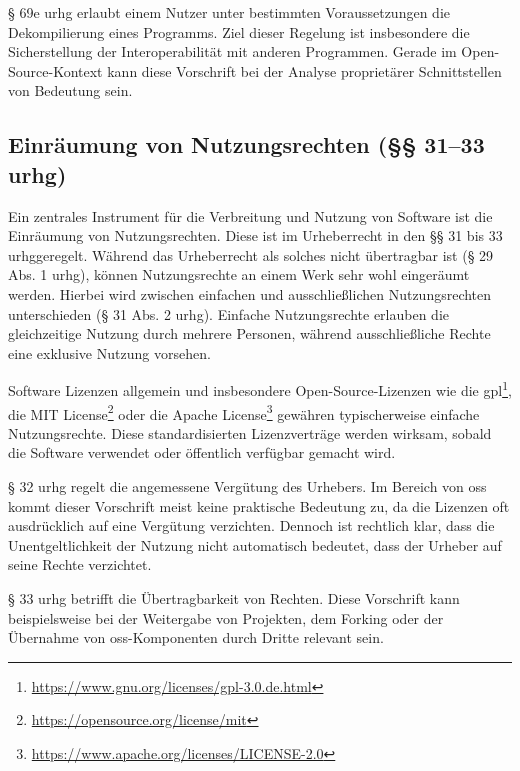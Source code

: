 § 69e \gls{urhg} erlaubt einem Nutzer unter bestimmten Voraussetzungen die Dekompilierung eines Programms.
Ziel dieser Regelung ist insbesondere die Sicherstellung der Interoperabilität mit anderen Programmen.
Gerade im Open-Source-Kontext kann diese Vorschrift bei der Analyse proprietärer Schnittstellen von Bedeutung sein.


\subsection{Einräumung von Nutzungsrechten (§§ 31–33 \gls{urhg})}

Ein zentrales Instrument für die Verbreitung und Nutzung von Software ist die Einräumung von Nutzungsrechten.
Diese ist im Urheberrecht in den §§ 31 bis 33 \gls{urhg}geregelt.
Während das Urheberrecht als solches nicht übertragbar ist (§ 29 Abs. 1 \gls{urhg}), können Nutzungsrechte an einem Werk sehr wohl eingeräumt werden.
Hierbei wird zwischen einfachen und ausschließlichen Nutzungsrechten unterschieden (§ 31 Abs. 2 \gls{urhg}).
Einfache Nutzungsrechte erlauben die gleichzeitige Nutzung durch mehrere Personen, während ausschließliche Rechte eine exklusive Nutzung vorsehen.

Software Lizenzen allgemein und insbesondere Open-Source-Lizenzen wie die \gls{gpl}\footnote{\url{https://www.gnu.org/licenses/gpl-3.0.de.html}}, die MIT License\footnote{\url{https://opensource.org/license/mit}} oder die Apache
License\footnote{\url{https://www.apache.org/licenses/LICENSE-2.0}} gewähren typischerweise einfache Nutzungsrechte.
Diese standardisierten Lizenzverträge werden wirksam, sobald die Software verwendet oder öffentlich verfügbar gemacht wird.

§ 32 \gls{urhg} regelt die angemessene Vergütung des Urhebers.
Im Bereich von \gls{oss} kommt dieser Vorschrift meist keine praktische Bedeutung zu, da die Lizenzen oft ausdrücklich auf eine Vergütung verzichten.
Dennoch ist rechtlich klar, dass die Unentgeltlichkeit der Nutzung nicht automatisch bedeutet, dass der Urheber auf seine Rechte verzichtet.

§ 33 \gls{urhg} betrifft die Übertragbarkeit von Rechten.
Diese Vorschrift kann beispielsweise bei der Weitergabe von Projekten, dem Forking oder der Übernahme von \gls{oss}-Komponenten durch Dritte relevant sein.

